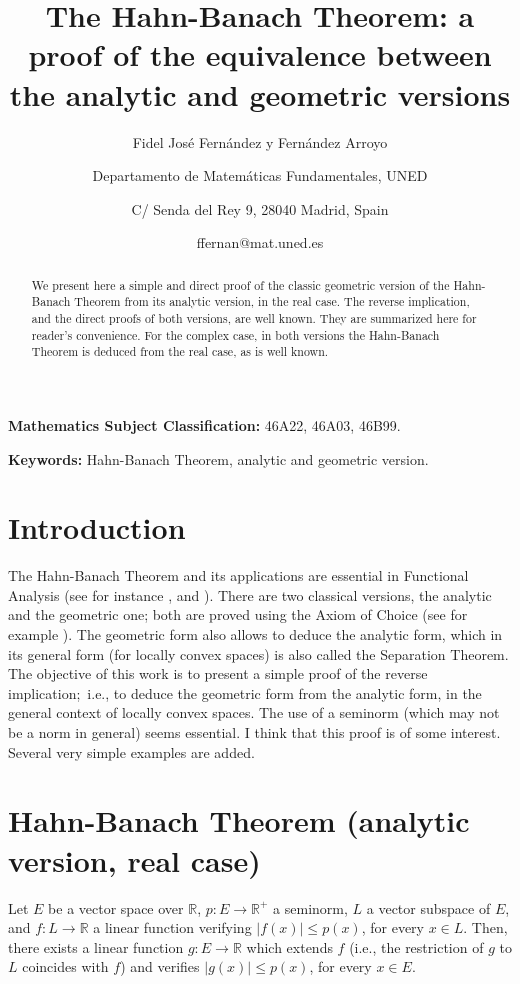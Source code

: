 \documentclass{article}
\begin{document}
\author{Fidel Jos\'{e} Fern\'{a}ndez y Fern\'{a}ndez Arroyo
\and Departamento de Matem\'{a}ticas Fundamentales, UNED
\and C/ Senda del Rey 9, 28040 Madrid, Spain
\and ffernan@mat.uned.es}
\title{The Hahn-Banach Theorem: a proof of the equivalence between the analytic and
geometric versions}
\maketitle

\begin{abstract}
We present here a simple and direct proof of the classic geometric version of
the Hahn-Banach Theorem from its analytic version, in the real case. The reverse
implication, and the direct proofs of both versions, are well known. They are
summarized here for reader's convenience. For the complex case, in both versions the Hahn-Banach Theorem is deduced from the real case, as is well known.
\end{abstract}

\textbf{Mathematics Subject Classification:} 46A22, 46A03, 46B99.

\textbf{Keywords:} Hahn-Banach Theorem, analytic and geometric version.

\section{Introduction}

The Hahn-Banach Theorem and its applications are essential in Functional
Analysis (see for instance \cite{nb}, \cite{s} and \cite{v}). There are two classical versions, the analytic and the geometric one; both are proved using the Axiom of Choice (see for example \cite{b}). The geometric form also allows to deduce the analytic form, which in its general form (for locally convex spaces) is also called the Separation Theorem. The objective of this work is to present a simple proof of the reverse
implication;\ i.e., to deduce the geometric form from the analytic form, in
the general context of locally convex spaces. The use of a seminorm (which
may not be a norm in general) seems essential. I think that this proof is
of some interest. Several very simple examples are added.

\section{Hahn-Banach Theorem (analytic version, real case)}

Let $E$ be a vector space over $\mathbb{R}$, $p:E\rightarrow\mathbb{R}^{+}$ a seminorm, $L$ a vector subspace of $E$, and $f:L\rightarrow\mathbb{R}$ a linear function verifying $\vert f(x)\vert\leq p(x)$, for every $x\in L$. Then, there exists a linear function $g:E\rightarrow\mathbb{R}$ which extends $f$ (i.e., the restriction of $g$ to $L$ coincides with $f$) and verifies $\vert g(x)\vert\leq p(x)$, for
every $x\in E$.
\end{document}
